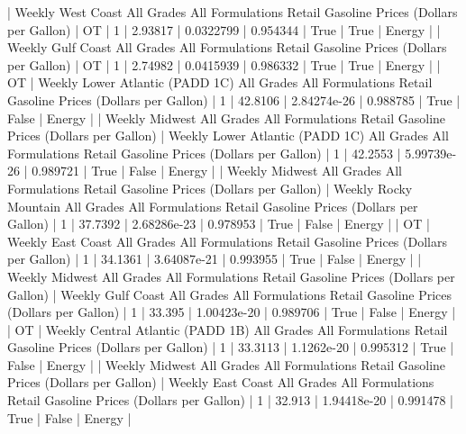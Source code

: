 {{{{{{{{{{{{| Weekly West Coast All Grades All Formulations Retail Gasoline Prices  (Dollars per Gallon)                 | OT                                                                                                         |          1 |  2.93817 | 0.0322799   | 0.954344 | True          | True           | Energy   |
| Weekly Gulf Coast All Grades All Formulations Retail Gasoline Prices  (Dollars per Gallon)                 | OT                                                                                                         |          1 |  2.74982 | 0.0415939   | 0.986332 | True          | True           | Energy   |
| OT                                                                                                         | Weekly Lower Atlantic (PADD 1C) All Grades All Formulations Retail Gasoline Prices  (Dollars per Gallon)   |          1 | 42.8106  | 2.84274e-26 | 0.988785 | True          | False          | Energy   |
| Weekly Midwest All Grades All Formulations Retail Gasoline Prices  (Dollars per Gallon)                    | Weekly Lower Atlantic (PADD 1C) All Grades All Formulations Retail Gasoline Prices  (Dollars per Gallon)   |          1 | 42.2553  | 5.99739e-26 | 0.989721 | True          | False          | Energy   |
| Weekly Midwest All Grades All Formulations Retail Gasoline Prices  (Dollars per Gallon)                    | Weekly Rocky Mountain All Grades All Formulations Retail Gasoline Prices  (Dollars per Gallon)             |          1 | 37.7392  | 2.68286e-23 | 0.978953 | True          | False          | Energy   |
| OT                                                                                                         | Weekly East Coast All Grades All Formulations Retail Gasoline Prices  (Dollars per Gallon)                 |          1 | 34.1361  | 3.64087e-21 | 0.993955 | True          | False          | Energy   |
| Weekly Midwest All Grades All Formulations Retail Gasoline Prices  (Dollars per Gallon)                    | Weekly Gulf Coast All Grades All Formulations Retail Gasoline Prices  (Dollars per Gallon)                 |          1 | 33.395   | 1.00423e-20 | 0.989706 | True          | False          | Energy   |
| OT                                                                                                         | Weekly Central Atlantic (PADD 1B) All Grades All Formulations Retail Gasoline Prices  (Dollars per Gallon) |          1 | 33.3113  | 1.1262e-20  | 0.995312 | True          | False          | Energy   |
| Weekly Midwest All Grades All Formulations Retail Gasoline Prices  (Dollars per Gallon)                    | Weekly East Coast All Grades All Formulations Retail Gasoline Prices  (Dollars per Gallon)                 |          1 | 32.913   | 1.94418e-20 | 0.991478 | True          | False          | Energy   |
}}}}}}}}}}}}
